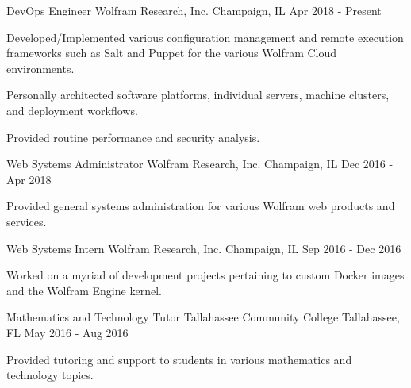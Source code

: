 

\begin{cventries}

  \cventry
    {DevOps Engineer} %
    {Wolfram Research, Inc.} %
    {Champaign, IL} %
    {Apr 2018 - Present} %
    {
      \begin{cvitems} %
        \item {Developed/Implemented various configuration management and remote execution frameworks such as Salt and Puppet for the various Wolfram Cloud environments.}
        \item {Personally architected software platforms, individual servers, machine clusters, and deployment workflows.}
        \item {Provided routine performance and security analysis.}
      \end{cvitems}
    }

  \cventry
    {Web Systems Administrator} %
    {Wolfram Research, Inc.} %
    {Champaign, IL} %
    {Dec 2016 - Apr 2018} %
    {
      \begin{cvitems} %
        \item {Provided general systems administration for various Wolfram web products and services.}
      \end{cvitems}
    }

  \cventry
    {Web Systems Intern} %
    {Wolfram Research, Inc.} %
    {Champaign, IL} %
    {Sep 2016 - Dec 2016} %
    {
      \begin{cvitems} %
        \item {Worked on a myriad of development projects pertaining to custom Docker images and the Wolfram Engine kernel.}
      \end{cvitems}
    }

  \cventry
    {Mathematics and Technology Tutor} %
    {Tallahassee Community College} %
    {Tallahassee, FL} %
    {May 2016 - Aug 2016} %
    {
      \begin{cvitems} %
        \item {Provided tutoring and support to students in various mathematics and technology topics.}
      \end{cvitems}
    }

\end{cventries}

